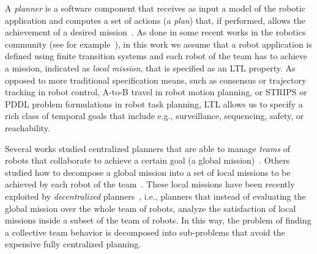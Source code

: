 
A \emph{planner} is  a software component that receives as input a model of the robotic application and computes  a set of actions (a \emph{plan}) that, if performed, allows the achievement of a desired mission~\cite{latombe2012robot}.
As done in some recent works in the robotics community (see for example~\cite{fainekos2005temporal,kress2007s,kloetzer2008fully,fainekos2009temporal,wongpiromsarn2010receding,bhatia2010sampling,bhatia2010motion}), in this work we assume that 
a robot application is defined using finite transition systems and
each robot of the team  has to achieve a mission,  indicated as \emph{local mission}, that is specified as an LTL property. 
As opposed to more traditional specification means, such as consensus or trajectory tracking in robot control, A-to-B travel in robot motion planning, or STRIPS or PDDL problem formulations in robot task planning, LTL allows us to specify a rich class of temporal goals that include e.g., surveillance, sequencing, safety, or reachability.

Several works studied centralized planners that are able to manage \emph{teams} of robots that collaborate to achieve a certain goal (a global mission)~\cite{kloetzer2011multi,loizou2005automated,quottrup2004multi}.
Others studied how to decompose a global mission into a set of local missions to be achieved by each robot of the team~\cite{schillinger2016decomposition,guo2015multi,guo2015multi,tumova2016multi}. 
These local missions have been recently exploited by \emph{decentralized} planners~\cite{tumova2016multi}, i.e., planners that instead of evaluating the global mission over the whole team of robots, analyze the satisfaction of local missions inside a subset of the team of robots. 
In this way, the problem of finding a collective team behavior is decomposed into sub-problems that avoid the expensive fully centralized planning.

